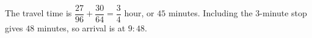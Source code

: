 The travel time is $\dfrac{27}{96}+\dfrac{30}{64}=\dfrac{3}{4}$ hour, or $45$ minutes. Including the $3$-minute stop gives $48$ minutes, so arrival is at $\boxed{9{:}48}$.
